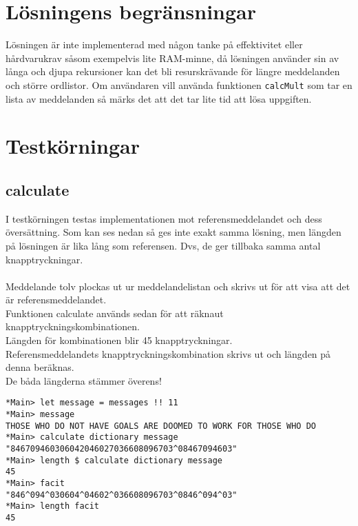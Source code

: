 \documentclass[a4paper]{article}
\def\code#1{\texttt{#1}}
\begin{document}
\section{Lösningens begränsningar}\label{lb}
Lösningen är inte implementerad med någon tanke på effektivitet eller hårdvarukrav såsom exempelvis lite RAM-minne, då lösningen använder sin av långa och djupa rekursioner kan det bli resurskrävande för längre meddelanden och större ordlistor. 
Om användaren vill använda funktionen \code{calcMult} som tar en lista av meddelanden så märks det att det tar lite tid att lösa uppgiften.
\newpage
\section{Testkörningar}\label{test}
\subsection{calculate}
I testkörningen testas implementationen mot referensmeddelandet och dess översättning.
Som kan ses nedan så ges inte exakt samma lösning, men längden på lösningen är lika lång som referensen. Dvs, de ger tillbaka samma antal knapptryckningar. \\ \\
Meddelande tolv plockas ut ur meddelandelistan och skrivs ut för att visa att det är referensmeddelandet.\\
Funktionen calculate används sedan för att räknaut knapptryckningskombinationen. \\
Längden för kombinationen blir 45 knapptryckningar.\\
Referensmeddelandets knapptryckningskombination skrivs ut och längden på denna beräknas.\\
De båda längderna stämmer överens!

\begin{verbatim}
*Main> let message = messages !! 11
*Main> message
THOSE WHO DO NOT HAVE GOALS ARE DOOMED TO WORK FOR THOSE WHO DO
*Main> calculate dictionary message
"846709460306042046027036608096703^08467094603"
*Main> length $ calculate dictionary message
45
*Main> facit
"846^094^030604^04602^036608096703^0846^094^03"
*Main> length facit 
45
\end{verbatim}
\end{document}
